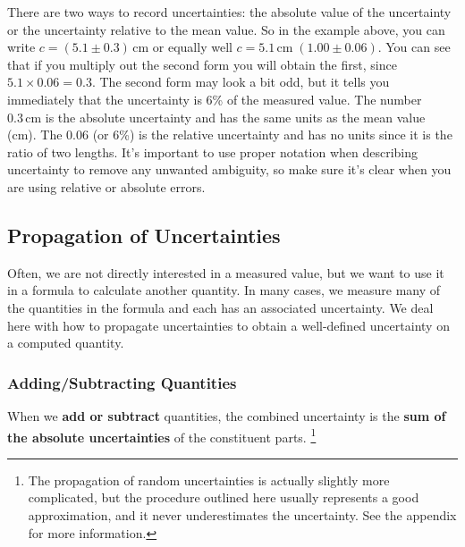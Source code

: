 There are two ways to record uncertainties: the absolute value of the uncertainty or the uncertainty relative to the mean value. So in the example above, you can write $c = (5.1 \pm 0.3)\,\mathrm{cm}$ or equally well $c = 5.1\,\mathrm{cm}\; (1.00 \pm 0.06)$. You can see that if you multiply out the second form you will obtain the first, since $5.1 \times 0.06 = 0.3$. The second form may look a bit odd, but it tells you immediately that the uncertainty is 6\% of the measured value. The number $0.3\,\mathrm{cm}$ is the absolute uncertainty and has the same units as the mean value (cm). The 0.06 (or 6\%) is the relative uncertainty and has no units since it is the ratio of two lengths. It's important to use proper notation when describing uncertainty to remove any unwanted ambiguity, so make sure it's clear when you are using relative or absolute errors.

\subsection{Propagation of Uncertainties}

Often, we are not directly interested in a measured value, but we want to use it in a formula to calculate another quantity. In many cases, we measure many of the quantities in the formula and each has an associated uncertainty. We deal here with how to propagate uncertainties to obtain a well-defined uncertainty on a computed quantity.

\subsubsection{Adding/Subtracting Quantities}

When we \textbf{add or subtract} quantities, the combined uncertainty is the \textbf{sum of the absolute uncertainties} of the constituent parts. \footnote{The propagation of random uncertainties is actually slightly more complicated, but the procedure outlined here usually represents a good approximation, and it never underestimates the uncertainty. See the appendix for more information.}

